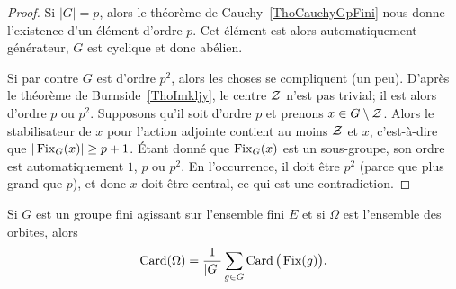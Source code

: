 \begin{proof}
    Si \( | G |=p\), alors le théorème de Cauchy~\ref{ThoCauchyGpFini} nous donne l'existence d'un élément d'ordre \( p\). Cet élément est alors automatiquement générateur, \( G\) est cyclique et donc abélien.

    Si par contre \( G\) est d'ordre \( p^2\), alors les choses se compliquent (un peu). D'après le théorème de Burnside~\ref{ThoImkljy}, le centre \( \mathcal{Z}\) n'est pas trivial; il est alors d'ordre \( p\) ou \( p^2\). Supposons qu'il soit d'ordre \( p\) et prenons \( x\in G\setminus\mathcal{Z}\). Alors le stabilisateur de \( x\) pour l'action adjointe contient au moins \( \mathcal{Z}\) et \( x\), c'est-à-dire que \( |\operatorname{Fix}_G(x)|\geq p+1\). Étant donné que \( \operatorname{Fix}_G(x)\) est un sous-groupe, son ordre est automatiquement \( 1\), \( p\) ou \( p^2\). En l'occurrence, il doit être \( p^2\) (parce que plus grand que \( p\)), et donc \( x\) doit être central, ce qui est une contradiction.
\end{proof}


\begin{theorem}      \label{THOooEFDMooDfosOw}
    Si \( G\) est un groupe fini agissant sur l'ensemble fini \( E\) et si \( \Omega\) est l'ensemble des orbites, alors
    \begin{equation}    \label{EqTUsblv}
        \operatorname{Card}(\Omega)=\frac{1}{ | G | }\sum_{g\in G}\operatorname{Card}\big( \operatorname{Fix}(g) \big).
    \end{equation}
\end{theorem}

